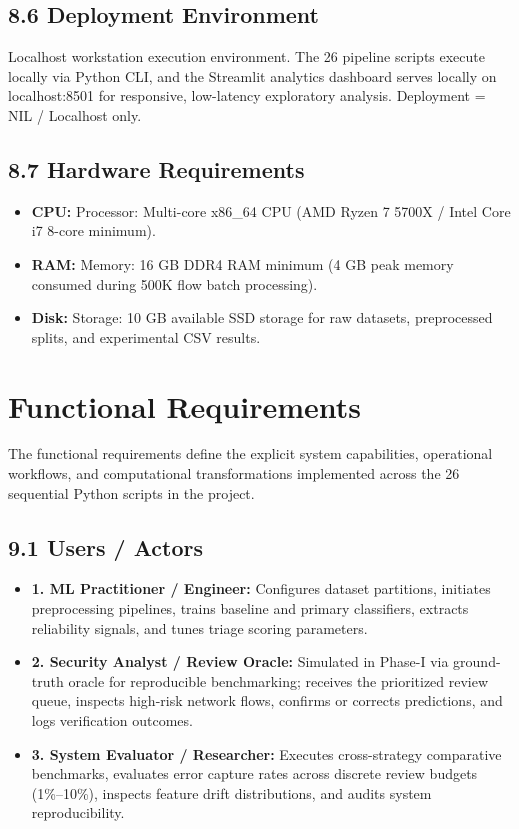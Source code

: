 \subsection{8.6 Deployment Environment}

Localhost workstation execution environment. The 26 pipeline scripts execute locally via Python CLI, and the Streamlit analytics dashboard serves locally on localhost:8501 for responsive, low-latency exploratory analysis. Deployment = NIL / Localhost only.

\subsection{8.7 Hardware Requirements}

\begin{itemize}
\item \textbf{CPU:} Processor: Multi-core x86\_64 CPU (AMD Ryzen 7 5700X / Intel Core i7 8-core minimum).
\item \textbf{RAM:} Memory: 16 GB DDR4 RAM minimum (4 GB peak memory consumed during 500K flow batch processing).
\item \textbf{Disk:} Storage: 10 GB available SSD storage for raw datasets, preprocessed splits, and experimental CSV results.
\end{itemize}

\section{Functional Requirements}

The functional requirements define the explicit system capabilities, operational workflows, and computational transformations implemented across the 26 sequential Python scripts in the project.

\subsection{9.1 Users / Actors}

\begin{itemize}
\item \textbf{1. ML Practitioner / Engineer:} Configures dataset partitions, initiates preprocessing pipelines, trains baseline and primary classifiers, extracts reliability signals, and tunes triage scoring parameters.
\item \textbf{2. Security Analyst / Review Oracle:} Simulated in Phase-I via ground-truth oracle for reproducible benchmarking; receives the prioritized review queue, inspects high-risk network flows, confirms or corrects predictions, and logs verification outcomes.
\item \textbf{3. System Evaluator / Researcher:} Executes cross-strategy comparative benchmarks, evaluates error capture rates across discrete review budgets (1\%--10\%), inspects feature drift distributions, and audits system reproducibility.
\end{itemize}

